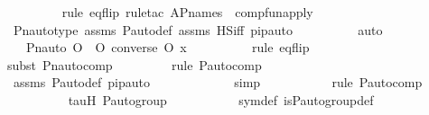 \begin{isabellebody}
\ \ \ \ \ \ \ \ \isamarkupfalse%
{\isacharparenleft}{\kern0pt}rule\ eq{\isacharunderscore}{\kern0pt}flip{\isacharcomma}{\kern0pt}\ rule{\isacharunderscore}{\kern0pt}tac\ A{\isacharequal}{\kern0pt}P{\isacharunderscore}{\kern0pt}names\ \ comp{\isacharunderscore}{\kern0pt}fun{\isacharunderscore}{\kern0pt}apply{\isacharparenright}{\kern0pt}\isanewline
\ \ \ \ \ \ \ \ \isamarkupfalse%
\ Pn{\isacharunderscore}{\kern0pt}auto{\isacharunderscore}{\kern0pt}type\ assms\ P{\isacharunderscore}{\kern0pt}auto{\isacharunderscore}{\kern0pt}def\ assms{}\ HS{\isacharunderscore}{\kern0pt}iff\ pi{\isacharunderscore}{\kern0pt}pauto\isanewline
\ \ \ \ \ \ \ \ \isamarkupfalse%
\ auto\isanewline
\ \ \ \ \ \ \isamarkupfalse%
\ \isamarkupfalse%
\ {\isachardoublequoteopen}{\isachardot}{\kern0pt}{\isachardot}{\kern0pt}{\isachardot}{\kern0pt}\ {\isacharequal}{\kern0pt}\ Pn{\isacharunderscore}{\kern0pt}auto{\isacharparenleft}{\kern0pt}{\isacharparenleft}{\kern0pt}{\isasympi}\ O\ {\isasymtau}\ O\ converse{\isacharparenleft}{\kern0pt}{\isasympi}{\isacharparenright}{\kern0pt}{\isacharparenright}{\kern0pt}\ O\ {\isasympi}{\isacharparenright}{\kern0pt}{\isacharbackquote}{\kern0pt}x{\isachardoublequoteclose}\ \isanewline
\ \ \ \ \ \ \ \ \isamarkupfalse%
{\isacharparenleft}{\kern0pt}rule\ eq{\isacharunderscore}{\kern0pt}flip{\isacharparenright}{\kern0pt}\isanewline
\ \ \ \ \ \ \ \ \isamarkupfalse%
{\isacharparenleft}{\kern0pt}subst\ Pn{\isacharunderscore}{\kern0pt}auto{\isacharunderscore}{\kern0pt}comp{\isacharparenright}{\kern0pt}\isanewline
\ \ \ \ \ \ \ \ \isamarkupfalse%
{\isacharparenleft}{\kern0pt}rule\ P{\isacharunderscore}{\kern0pt}auto{\isacharunderscore}{\kern0pt}comp{\isacharparenright}{\kern0pt}\isanewline
\ \ \ \ \ \ \ \ \isamarkupfalse%
\ assms\ P{\isacharunderscore}{\kern0pt}auto{\isacharunderscore}{\kern0pt}def\ pi{\isacharunderscore}{\kern0pt}pauto\isanewline
\ \ \ \ \ \ \ \ \ \ \ \isamarkupfalse%
\ simp\isanewline
\ \ \ \ \ \ \ \ \ \ \isamarkupfalse%
{\isacharparenleft}{\kern0pt}rule\ P{\isacharunderscore}{\kern0pt}auto{\isacharunderscore}{\kern0pt}comp{\isacharparenright}{\kern0pt}\isanewline
\ \ \ \ \ \ \ \ \isamarkupfalse%
\ tauH\ {\isasymG}{\isacharunderscore}{\kern0pt}P{\isacharunderscore}{\kern0pt}auto{\isacharunderscore}{\kern0pt}group\ \isanewline
\ \ \ \ \ \ \ \ \isamarkupfalse%
\ sym{\isacharunderscore}{\kern0pt}def\ is{\isacharunderscore}{\kern0pt}P{\isacharunderscore}{\kern0pt}auto{\isacharunderscore}{\kern0pt}group{\isacharunderscore}{\kern0pt}def\isanewline

\end{isabellebody}
